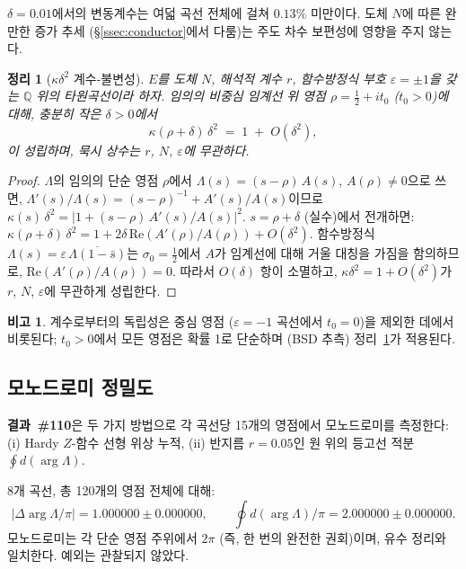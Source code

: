 \documentclass[11pt, a4paper]{article}
\theoremstyle{plain}
\newtheorem{theorem}{정리}
\theoremstyle{definition}
\newtheorem{remark}{비고}[section]
\begin{document}
$\delta=0.01$에서의 변동계수는 여덟 곡선 전체에 걸쳐 $0.13\%$ 미만이다.
도체 $N$에 따른 완만한 증가 추세
(\S\ref{ssec:conductor}에서 다룸)는
주도 차수 보편성에 영향을 주지 않는다.

\begin{theorem}[$\kappa\delta^{2}$ 계수-불변성]
\label{thm:rankinv}
  $E$를 도체 $N$, 해석적 계수 $r$,
  함수방정식 부호 $\varepsilon=\pm 1$을 갖는
  $\mathbb{Q}$ 위의 타원곡선이라 하자.
  임의의 비중심 임계선 위 영점 $\rho=\tfrac{1}{2}+it_{0}$
  ($t_{0}>0$)에 대해, 충분히 작은 $\delta>0$에서
  \[
    \kappa(\rho+\delta)\,\delta^{2}
    \;=\; 1 \;+\; O(\delta^{2}),
  \]
  이 성립하며, 묵시 상수는 $r$, $N$, $\varepsilon$에 무관하다.
\end{theorem}

\begin{proof}
  $\Lambda$의 임의의 단순 영점 $\rho$에서
  $\Lambda(s) = (s-\rho)\,A(s)$, $A(\rho)\neq 0$으로 쓰면,
  $\Lambda'(s)/\Lambda(s) = (s-\rho)^{-1} + A'(s)/A(s)$이므로
  $\kappa(s)\,\delta^{2} = |1 + (s-\rho)\,A'(s)/A(s)|^{2}$.
  $s=\rho+\delta$ (실수)에서 전개하면:
  $\kappa(\rho+\delta)\,\delta^{2} = 1 + 2\delta\,\mathrm{Re}(A'(\rho)/A(\rho))
  + O(\delta^{2})$.
  함수방정식 $\Lambda(s) = \varepsilon\,\overline{\Lambda(1-\bar{s})}$는
  $\sigma_{0}=\tfrac{1}{2}$에서 $A$가 임계선에 대해
  거울 대칭을 가짐을 함의하므로,
  $\mathrm{Re}(A'(\rho)/A(\rho))=0$.
  따라서 $O(\delta)$ 항이 소멸하고,
  $\kappa\delta^{2}=1+O(\delta^{2})$가 $r$, $N$, $\varepsilon$에 무관하게 성립한다.
\end{proof}

\begin{remark}
  계수로부터의 독립성은 중심 영점 ($\varepsilon=-1$ 곡선에서 $t_{0}=0$)을
  제외한 데에서 비롯된다;
  $t_{0}>0$에서 모든 영점은 확률 1로 단순하며 (BSD 추측)
  정리~\ref{thm:rankinv}가 적용된다.
\end{remark}


\subsection{모노드로미 정밀도}
\label{ssec:mono}

\textbf{결과~\#110}은 두 가지 방법으로 각 곡선당 15개의 영점에서
모노드로미를 측정한다: (i) Hardy $Z$-함수 선형 위상 누적,
(ii) 반지름 $r=0.05$인 원 위의 등고선 적분
$\oint d(\arg\Lambda)$.

\medskip
\noindent 8개 곡선, 총 120개의 영점 전체에 대해:
\[
  |\Delta\!\arg\Lambda / \pi| = 1.000000\pm 0.000000,
  \qquad
  \oint d(\arg\Lambda)/\pi = 2.000000\pm 0.000000.
\]
모노드로미는 각 단순 영점 주위에서 $2\pi$ (즉, 한 번의 완전한 권회)이며,
유수 정리와 일치한다. 예외는 관찰되지 않았다.
\end{document}
